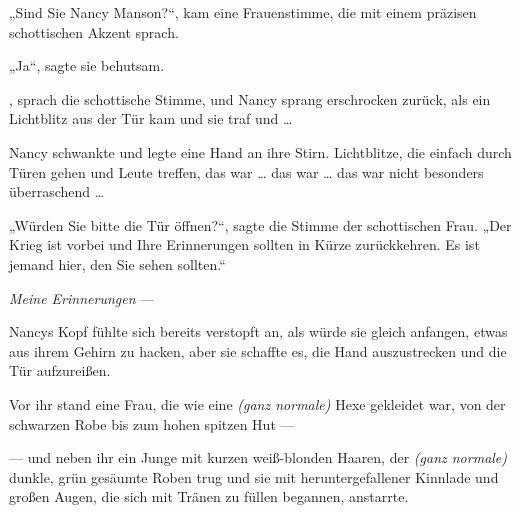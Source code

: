 „Sind Sie Nancy Manson?“, kam eine Frauenstimme, die mit einem präzisen schottischen Akzent sprach.

„Ja“, sagte sie behutsam.

, sprach die schottische Stimme, und Nancy sprang erschrocken zurück, als ein Lichtblitz aus der Tür kam und sie traf und …

Nancy schwankte und legte eine Hand an ihre Stirn. Lichtblitze, die einfach durch Türen gehen und Leute treffen, das war … das war … das war nicht besonders überraschend …

„Würden Sie bitte die Tür öffnen?“, sagte die Stimme der schottischen Frau.
„Der Krieg ist vorbei und Ihre Erinnerungen sollten in Kürze zurückkehren. Es ist jemand hier, den Sie sehen sollten.“

\emph{Meine Erinnerungen} —

Nancys Kopf fühlte sich bereits verstopft an, als würde sie gleich anfangen, etwas aus ihrem Gehirn zu hacken, aber sie schaffte es, die Hand auszustrecken und die Tür aufzureißen.

Vor ihr stand eine Frau, die wie eine \emph{(ganz normale)} Hexe gekleidet war, von der schwarzen Robe bis zum hohen spitzen Hut —

— und neben ihr ein Junge mit kurzen weiß-blonden Haaren, der \emph{(ganz normale)} dunkle, grün gesäumte Roben trug und sie mit heruntergefallener Kinnlade und großen Augen, die sich mit Tränen zu füllen begannen, anstarrte.


